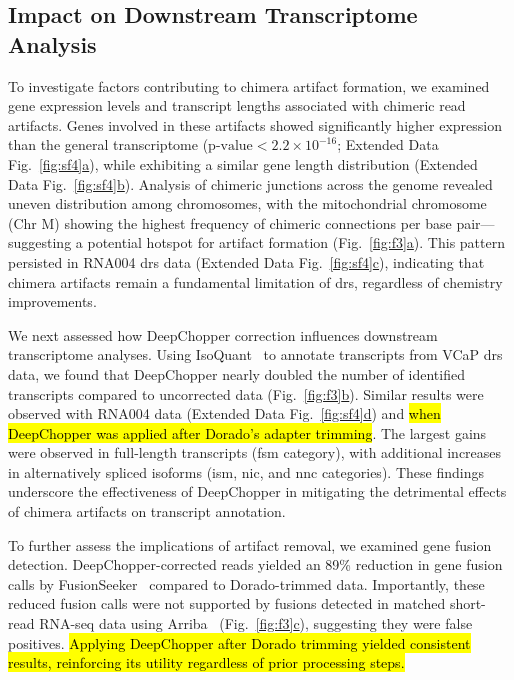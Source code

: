 \documentclass[pdflatex,sn-nature, lineno]{sn-jnl}%
\newcommand{\figref}[2]{Fig.~\hyperref[#1]{\ref*{#1}#2}}
\newcommand{\edfigref}[2]{Extended Data Fig.~\hyperref[#1]{\ref*{#1}#2}}
\begin{document}
\subsection{Impact on Downstream Transcriptome Analysis}

To investigate factors contributing to chimera artifact formation, we examined gene expression levels and transcript lengths associated with chimeric read artifacts.
Genes involved in these artifacts showed significantly higher expression than the general transcriptome (\(\textrm{p-value} < 2.2 \times 10^{-16}\); \edfigref{fig:sf4}{a}), while exhibiting a similar gene length distribution (\edfigref{fig:sf4}{b}).
Analysis of chimeric junctions across the genome revealed uneven distribution among chromosomes, with the mitochondrial chromosome (Chr M) showing the highest frequency of chimeric connections per base pair—suggesting a potential hotspot for artifact formation (\figref{fig:f3}{a}).
This pattern persisted in RNA004 \gls{drs} data (\edfigref{fig:sf4}{c}), indicating that chimera artifacts remain a fundamental limitation of \gls{drs}, regardless of chemistry improvements.

We next assessed how DeepChopper correction influences downstream transcriptome analyses.
Using IsoQuant~\cite{prjibelski2023accurate} to annotate transcripts from VCaP \gls{drs} data, we found that DeepChopper nearly doubled the number of identified transcripts compared to uncorrected data (\figref{fig:f3}{b}).
Similar results were observed with RNA004 data (\edfigref{fig:sf4}{d}) and \hl{when DeepChopper was applied after Dorado’s adapter trimming}.
The largest gains were observed in full-length transcripts (\gls{fsm} category), with additional increases in alternatively spliced isoforms (\gls{ism}, \gls{nic}, and \gls{nnc} categories).
These findings underscore the effectiveness of DeepChopper in mitigating the detrimental effects of chimera artifacts on transcript annotation.

To further assess the implications of artifact removal, we examined gene fusion detection. DeepChopper-corrected reads yielded an 89\% reduction in gene fusion calls by FusionSeeker~\cite{chen2023gene} compared to Dorado-trimmed data. Importantly, these reduced fusion calls were not supported by fusions detected in matched short-read RNA-seq data using Arriba~\cite{uhrig2021accurate} (\figref{fig:f3}{c}), suggesting they were false positives. \hl{Applying DeepChopper after Dorado trimming yielded consistent results, reinforcing its utility regardless of prior processing steps.}
\end{document}
